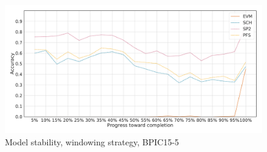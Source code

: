 \begin{figure}[!htb]
    \centering
    \includegraphics[width=\textwidth]{gfx/bpic2015_5/windowed_stability.pdf}
    \caption{Model stability, windowing strategy, BPIC15-5}
    \label{fig:bpic15-5-windowed-stability}
\end{figure}
